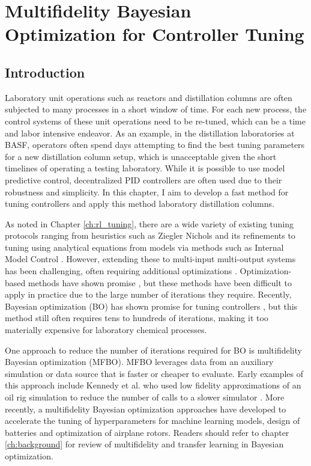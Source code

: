 \chapter{Multifidelity Bayesian Optimization for Controller Tuning}\label{ch:mfbo} 

\section{Introduction}
\label{sec:intro}
Laboratory unit operations such as reactors and distillation columns  are often subjected to many processes in a short window of time. For each new process, the control systems of these unit operations need to be re-tuned, which can be a time and labor intensive endeavor. As an example, in the distillation laboratories at BASF, operators often spend days attempting to find the best tuning parameters for a new distillation column setup, which is unacceptable given the short timelines of operating a testing laboratory. While it is possible to use model predictive control, decentralized PID controllers are often used due to their robustness and simplicity. In this chapter, I aim to develop a fast method for tuning controllers and apply this method laboratory distillation columns.

As noted in Chapter \ref{ch:rl_tuning}, there are a wide variety of existing tuning protocols ranging from heuristics such as Ziegler Nichols \cite{Ziegler1942} and its refinements \cite{Hang1991} to tuning using analytical equations from models via methods such as  Internal Model Control \cite{Copeland2010}. However, extending these to multi-input multi-output systems has been challenging, often requiring additional optimizations \cite{Nandong2013, Nandong2015}. Optimization-based methods have shown promise \cite{Pajares2019, Sumana2010, Rajapandiyan2012, Behroozsarand2012}, but these methods have been difficult to apply in practice due to the large number of iterations they require. Recently, Bayesian optimization (BO) has shown promise for tuning controllers \cite{NeumannBrosig2020, Fiducioso2019, Khosravi2020, Konig2020, Fujimoto2022, Brunzema2022, Khosravi2022}, but this method still often requires tens to hundreds of iterations, making it too materially expensive for laboratory chemical processes.

One approach to reduce the number of iterations required for BO is multifidelity Bayesian optimization (MFBO). MFBO leverages data from an auxiliary simulation or data source that is faster or cheaper to evaluate. Early examples of this approach include Kennedy et al. who used low fidelity approximations of an oil rig simulation to reduce the number of calls to a slower simulator \cite{Kennedy2000}. More recently, a multifidelity Bayesian optimization approaches have developed to accelerate the tuning of hyperparameters for machine learning models, design of batteries and optimization of airplane rotors. Readers should refer to chapter \ref{ch:background} for review of multifidelity and transfer learning in Bayesian optimization.

